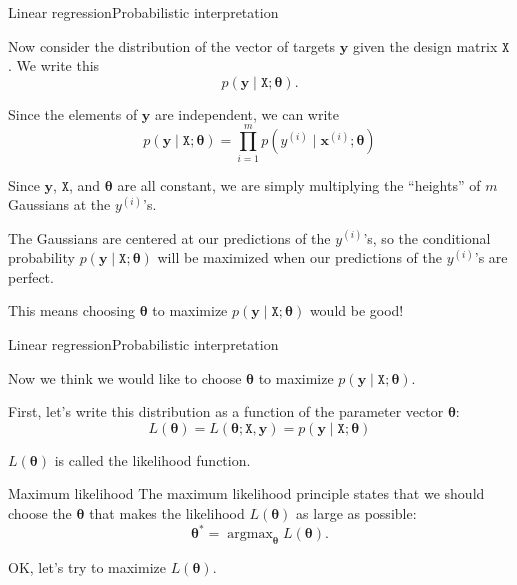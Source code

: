 \documentclass{beamer}
\renewcommand{\vec}[1]{\boldsymbol{#1}}
\newcommand{\mat}[1]{\mathtt{#1}}
\DeclareMathOperator*{\argmax}{argmax}
\begin{document}
\begin{frame}{Linear regression}{Probabilistic interpretation}

  Now consider the distribution of the vector of targets $\vec{y}$
  given the \alert{design matrix} $\mat{X}$. We write this
  \[ p(\vec{y} \mid \mat{X} ; \vec{\theta}) .\]

  \medskip

  Since the elements of $\vec{y}$ are independent, we can write
  \[ p(\vec{y} \mid \mat{X} ; \vec{\theta}) = \prod_{i=1}^m
  p(y^{(i)} \mid \vec{x}^{(i)} ; \vec{\theta} ) \]

  \medskip

  Since $\vec{y}$, $\mat{X}$, and $\vec{\theta}$ are all constant,
  we are simply multiplying the ``heights'' of $m$ Gaussians at the $y^{(i)}$'s.

  \medskip

  The Gaussians are centered at our \alert{predictions} of the
  $y^{(i)}$'s, so the conditional probability $p(\vec{y} \mid \mat{X}
  ; \vec{\theta})$ will be \alert{maximized} when our predictions of
  the $y^{(i)}$'s are \alert{perfect}.
  
  \medskip

  This means \alert{choosing $\vec{\theta}$ to maximize $p(\vec{y} \mid
  \mat{X} ; \vec{\theta})$} would be good!

\end{frame}


\begin{frame}{Linear regression}{Probabilistic interpretation}

  Now we think we would like to choose $\vec{\theta}$ to maximize
  $p(\vec{y} \mid \mat{X} ; \vec{\theta})$.

  \medskip

  First, let's write this distribution as a \alert{function} of the
  parameter vector $\vec{\theta}$:
  \[ L(\vec{\theta}) = L(\vec{\theta} ; \mat{X}, \vec{y}) = p(\vec{y} \mid \mat{X} ; \vec{\theta}) \]

  \medskip

  $L(\vec{\theta})$ is called the \alert{likelihood} function.

  \begin{block}{Maximum likelihood}
    The \alert{maximum likelihood} principle states that we should choose
    the $\vec{\theta}$ that makes the likelihood $L(\vec{\theta})$ as large
    as possible:
    \[ \vec{\theta}^* = \argmax_{\vec{\theta}} L(\vec{\theta}). \]
  \end{block}
  
  OK, let's try to maximize $L(\vec{\theta})$.
  
\end{frame}
\end{document}
